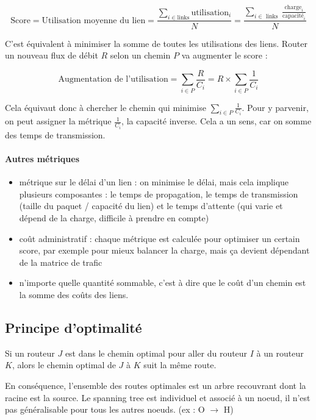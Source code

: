 	$$\text{Score} = \text{Utilisation moyenne du lien} = \frac{\sum_{i \in \text{links}} \text{utilisation}_i}{N} = \frac{\sum_{i \in  \text{ links }} \frac{\text{charge}_i}{\text{capacité}_i}}{N}$$

	C'est équivalent à minimiser la somme de toutes les utilisations des liens. Router un nouveau flux de débit $R$ selon un chemin $P$ va augmenter le score :

	$$\text{Augmentation de l'utilisation} = \sum_{i \in P} \frac{R}{C_i} = R \times \sum_{i \in P} \frac{1}{C_i}$$

	Cela équivaut donc à chercher le chemin qui minimise $\sum_{i \in P} \frac{1}{C_i}$. Pour y parvenir, on peut assigner la métrique $\frac{1}{C_i}$, la capacité inverse. Cela a un sens, car on somme des temps de transmission.

	\paragraph{Autres métriques}

	\begin{itemize}
		\item métrique sur le délai d'un lien : on minimise le délai, mais cela implique plusieurs composantes : le temps de propagation, le temps de transmission (taille du paquet / capacité du lien) et le temps d'attente (qui varie et dépend de la charge, difficile à prendre en compte)
		\item coût administratif : chaque métrique est calculée pour optimiser un certain score, par exemple pour mieux balancer la charge, mais ça devient dépendant de la matrice de trafic
		\item n'importe quelle quantité sommable, c'est à dire que le coût d'un chemin est la somme des coûts des liens.
	\end{itemize}


	\subsection{Principe d'optimalité}
	
	Si un routeur $J$ est dans le chemin optimal pour aller du routeur $I$ à un routeur $K$, alors le chemin optimal de $J$ à $K$ suit la même route.
	
	En conséquence, l'ensemble des routes optimales est un arbre recouvrant dont la racine est la source. Le spanning tree est individuel et associé à un noeud, il n'est pas généralisable pour tous les autres noeuds. (ex : O $\rightarrow$ H)
	
